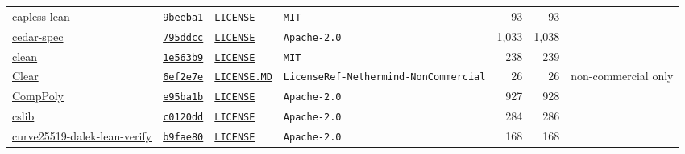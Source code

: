 \documentclass{article}
\begin{document}
\begin{table}[p]
\begin{tabular}{lllp{2.9cm}rrl}
    \href{https://github.com/Linyxus/capless-lean}{capless-lean} & \href{https://github.com/Linyxus/capless-lean/tree/9beeba12d520c447791349f079256254fc413f1b}{\texttt{9beeba1}} & \href{https://github.com/Linyxus/capless-lean/blob/9beeba12d520c447791349f079256254fc413f1b/LICENSE}{\texttt{LICENSE}} & \texttt{MIT} & 93 & 93 &  \\
    \href{https://github.com/cedar-policy/cedar-spec}{cedar-spec} & \href{https://github.com/cedar-policy/cedar-spec/tree/795ddccff61c83aeb5d6a7ccd22abf5e00164c73}{\texttt{795ddcc}} & \href{https://github.com/cedar-policy/cedar-spec/blob/795ddccff61c83aeb5d6a7ccd22abf5e00164c73/LICENSE}{\texttt{LICENSE}} & \texttt{Apache-2.0} & 1{,}033 & 1{,}038 &  \\
    \href{https://github.com/Verified-zkEVM/clean}{clean} & \href{https://github.com/Verified-zkEVM/clean/tree/1e563b9c27991b3795eb440c1ee0757edb4ce8b1}{\texttt{1e563b9}} & \href{https://github.com/Verified-zkEVM/clean/blob/1e563b9c27991b3795eb440c1ee0757edb4ce8b1/LICENSE}{\texttt{LICENSE}} & \texttt{MIT} & 238 & 239 &  \\
    \href{https://github.com/NethermindEth/Clear}{Clear} & \href{https://github.com/NethermindEth/Clear/tree/6ef2e7eda01080e5d5fd7474354c1a71adab5071}{\texttt{6ef2e7e}} & \href{https://github.com/NethermindEth/Clear/blob/6ef2e7eda01080e5d5fd7474354c1a71adab5071/LICENSE.MD}{\texttt{LICENSE.MD}} & \texttt{LicenseRef-Nethermind-}\allowbreak\texttt{NonCommercial} & 26 & 26 & non-commercial only \\
    \href{https://github.com/Verified-zkEVM/CompPoly}{CompPoly} & \href{https://github.com/Verified-zkEVM/CompPoly/tree/e95ba1b1cac21ac3e980725abcfb2a0c707d1062}{\texttt{e95ba1b}} & \href{https://github.com/Verified-zkEVM/CompPoly/blob/e95ba1b1cac21ac3e980725abcfb2a0c707d1062/LICENSE}{\texttt{LICENSE}} & \texttt{Apache-2.0} & 927 & 928 &  \\
    \href{https://github.com/leanprover/cslib}{cslib} & \href{https://github.com/leanprover/cslib/tree/c0120dddfe75d4ab913691c0c184fc436927b19d}{\texttt{c0120dd}} & \href{https://github.com/leanprover/cslib/blob/c0120dddfe75d4ab913691c0c184fc436927b19d/LICENSE}{\texttt{LICENSE}} & \texttt{Apache-2.0} & 284 & 286 &  \\
    \href{https://github.com/Beneficial-AI-Foundation/curve25519-dalek-lean-verify}{curve25519-dalek-lean-verify} & \href{https://github.com/Beneficial-AI-Foundation/curve25519-dalek-lean-verify/tree/b9fae801a9e47ac522ea6455a28b78e1d1e1fda5}{\texttt{b9fae80}} & \href{https://github.com/Beneficial-AI-Foundation/curve25519-dalek-lean-verify/blob/b9fae801a9e47ac522ea6455a28b78e1d1e1fda5/LICENSE}{\texttt{LICENSE}} & \texttt{Apache-2.0} & 168 & 168 &  \\

\end{tabular}
\end{table}
\end{document}
